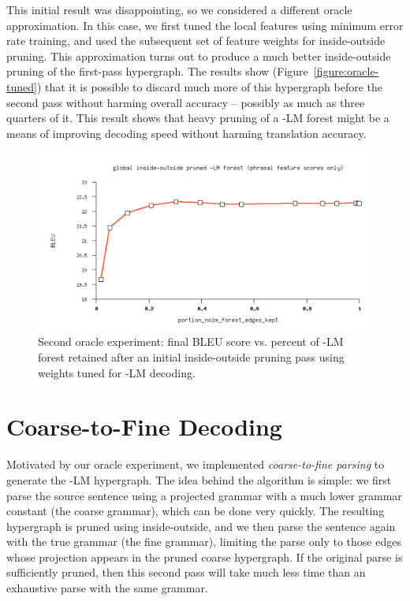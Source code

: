 This initial result was disappointing, so we considered a different oracle approximation.  In this case, we first tuned the local features using minimum error rate training, and used the subsequent set of feature weights for inside-outside pruning.  This approximation turns out to produce a much better inside-outside pruning of the first-pass hypergraph.  The results  show (Figure~\ref{figure:oracle-tuned}) that it is possible to discard much more of this hypergraph before the second pass without harming overall accuracy -- possibly as much as three quarters of it.  This result shows that heavy pruning of a -LM forest might be a means of improving decoding speed without harming translation accuracy.

\begin{figure}
	\includegraphics[scale=0.5]{prune-tuned}
	\caption{Second oracle experiment: final BLEU score vs. percent of -LM forest retained after an initial inside-outside pruning pass using weights tuned for -LM decoding. \label{figure:oracle-untuned}}
\end{figure}

\section{Coarse-to-Fine Decoding}\label{sec:ctf}

Motivated by our oracle experiment, we implemented {\it coarse-to-fine parsing} to generate the -LM hypergraph.  The idea behind the algorithm is simple: we first parse the source sentence using a projected grammar with a much lower grammar constant (the coarse grammar), which can be done very quickly.  The resulting hypergraph is pruned using inside-outside, and we then parse the sentence again with the true grammar (the fine grammar), limiting the parse only to those edges whose projection appears in the pruned coarse hypergraph.  If the original parse is sufficiently pruned, then this second pass will take much less time than an exhaustive parse with the same grammar.

